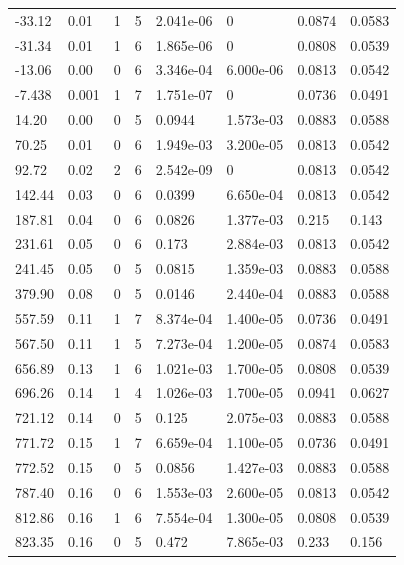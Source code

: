 \documentclass[preview]{standalone}
\begin{document}
{{\begin{tabular}{L{1.2cm}C{1.2cm} C{0.3cm}C{0.5cm} C{1.4cm}C{1.4cm} C{1.4cm}C{1.4cm}}
  -33.12  &  0.01  & 1     &  5 &  2.041e-06  & 0  & 0.0874 &  0.0583   \\ 
  -31.34  &  0.01  & 1     &  6 &  1.865e-06  & 0  & 0.0808 &  0.0539   \\ 
  -13.06  &  0.00  & 0     &  6 &  3.346e-04  & 6.000e-06  & 0.0813 &  0.0542   \\ 
  -7.438  &  0.001  & 1     &  7 &  1.751e-07  & 0  & 0.0736 &  0.0491   \\ 
  14.20  &  0.00  & 0     &  5 &  0.0944  & 1.573e-03  & 0.0883 &  0.0588   \\ 
  70.25  &  0.01  & 0     &  6 &  1.949e-03  & 3.200e-05  & 0.0813 &  0.0542   \\ 
  92.72  &  0.02  & 2     &  6 &  2.542e-09  & 0  & 0.0813 &  0.0542   \\ 
  142.44  &  0.03  & 0     &  6 &  0.0399  & 6.650e-04  & 0.0813 &  0.0542   \\ 
  187.81  &  0.04  & 0     &  6 &  0.0826  & 1.377e-03  & 0.215 &  0.143   \\ 
  231.61  &  0.05  & 0     &  6 &  0.173  & 2.884e-03  & 0.0813 &  0.0542   \\ 
  241.45  &  0.05  & 0     &  5 &  0.0815  & 1.359e-03  & 0.0883 &  0.0588   \\ 
  379.90  &  0.08  & 0     &  5 &  0.0146  & 2.440e-04  & 0.0883 &  0.0588   \\ 
  557.59  &  0.11  & 1     &  7 &  8.374e-04  & 1.400e-05  & 0.0736 &  0.0491   \\ 
  567.50  &  0.11  & 1     &  5 &  7.273e-04  & 1.200e-05  & 0.0874 &  0.0583   \\ 
  656.89  &  0.13  & 1     &  6 &  1.021e-03  & 1.700e-05  & 0.0808 &  0.0539   \\ 
  696.26  &  0.14  & 1     &  4 &  1.026e-03  & 1.700e-05  & 0.0941 &  0.0627   \\ 
  721.12  &  0.14  & 0     &  5 &  0.125  & 2.075e-03  & 0.0883 &  0.0588   \\ 
  771.72  &  0.15  & 1     &  7 &  6.659e-04  & 1.100e-05  & 0.0736 &  0.0491   \\ 
  772.52  &  0.15  & 0     &  5 &  0.0856  & 1.427e-03  & 0.0883 &  0.0588   \\ 
  787.40  &  0.16  & 0     &  6 &  1.553e-03  & 2.600e-05  & 0.0813 &  0.0542   \\ 
  812.86  &  0.16  & 1     &  6 &  7.554e-04  & 1.300e-05  & 0.0808 &  0.0539   \\ 
  823.35  &  0.16  & 0     &  5 &  0.472  & 7.865e-03  & 0.233 &  0.156   \\ 

\end{tabular}}}
\end{document}

